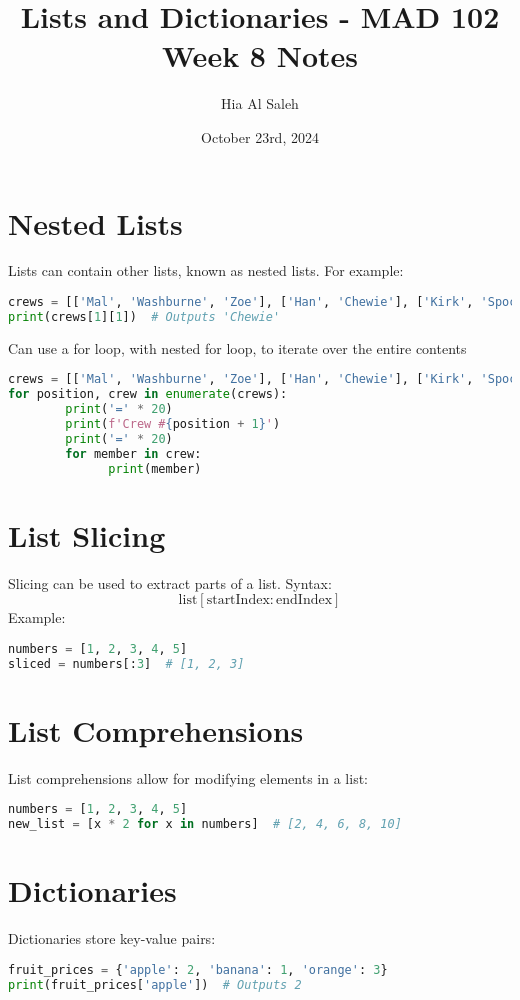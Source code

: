 \documentclass{article}
\title{Lists and Dictionaries - MAD 102 Week 8 Notes}
\author{Hia Al Saleh}
\date{October 23rd, 2024}
\begin{document}
\maketitle
\tableofcontents
\newpage

\section{Nested Lists}
Lists can contain other lists, known as nested lists. For example:

\begin{lstlisting}[language=python]
crews = [['Mal', 'Washburne', 'Zoe'], ['Han', 'Chewie'], ['Kirk', 'Spock', 'McCoy']]
print(crews[1][1])  # Outputs 'Chewie'
\end{lstlisting}
Can use a for loop, with nested for loop, to iterate over the entire contents
\begin{lstlisting}[language=python]
crews = [['Mal', 'Washburne', 'Zoe'], ['Han', 'Chewie'], ['Kirk', 'Spock', 'McCoy']]
for position, crew in enumerate(crews):
        print('=' * 20)
        print(f'Crew #{position + 1}')
        print('=' * 20)
        for member in crew:
              print(member)
\end{lstlisting}

\section{List Slicing}
Slicing can be used to extract parts of a list. Syntax:
\[
\text{list}[ \text{startIndex} : \text{endIndex} ]
\]
Example:
\begin{lstlisting}[language=python]
numbers = [1, 2, 3, 4, 5]
sliced = numbers[:3]  # [1, 2, 3]
\end{lstlisting}

\section{List Comprehensions}
List comprehensions allow for modifying elements in a list:
\begin{lstlisting}[language=python]
numbers = [1, 2, 3, 4, 5]
new_list = [x * 2 for x in numbers]  # [2, 4, 6, 8, 10]
\end{lstlisting}

\section{Dictionaries}
Dictionaries store key-value pairs:
\begin{lstlisting}[language=python]
fruit_prices = {'apple': 2, 'banana': 1, 'orange': 3}
print(fruit_prices['apple'])  # Outputs 2
\end{lstlisting}
\end{document}

